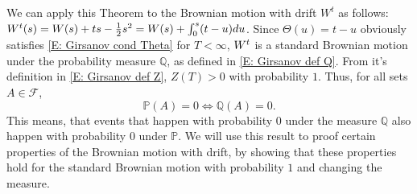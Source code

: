 We can apply this Theorem to the Brownian motion with drift $W^t$ as follows:
$W^t(s) = W(s) + ts - \frac{1}{2} s^2 = W(s) + \int_0^s (t-u)du $.
Since $\Theta(u) = t-u$ obviously satisfies \ref{E: Girsanov cond Theta} for $T < \infty$,
$W^t$ is a standard Brownian motion under the probability measure $\mathbb{Q}$, 
as defined in \eqref{E: Girsanov def Q}. 
From it's definition in \eqref{E: Girsanov def Z}, $Z(T) > 0$ with probability $1$.
Thus, for all sets $A \in \mathcal{F}$,
\begin{equation} \label{E: P0 = Q0}
\mathbb{P}(A) = 0 \iff \mathbb{Q}(A) = 0.
\end{equation}
This means, that events that happen with probability $0$ under the measure $\mathbb{Q}$ also happen with probability $0$ under $\mathbb{P}$.
We will use this result to proof certain properties of the Brownian motion with drift,
by showing that these properties hold for the standard Brownian motion with probability $1$ and changing the measure.


